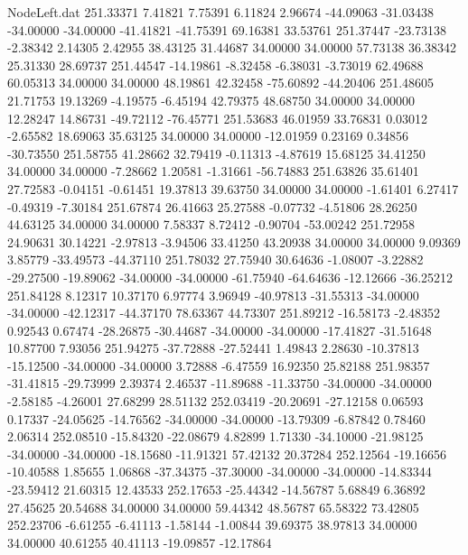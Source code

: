 \begin{filecontents}{NodeLeft.dat}
 251.33371    7.41821    7.75391     6.11824    2.96674  -44.09063  -31.03438  -34.00000  -34.00000  -41.41821  -41.75391   69.16381   33.53761
 251.37447  -23.73138   -2.38342     2.14305    2.42955   38.43125   31.44687   34.00000   34.00000   57.73138   36.38342   25.31330   28.69737
 251.44547  -14.19861   -8.32458    -6.38031   -3.73019   62.49688   60.05313   34.00000   34.00000   48.19861   42.32458  -75.60892  -44.20406
 251.48605   21.71753   19.13269    -4.19575   -6.45194   42.79375   48.68750   34.00000   34.00000   12.28247   14.86731  -49.72112  -76.45771
 251.53683   46.01959   33.76831     0.03012   -2.65582   18.69063   35.63125   34.00000   34.00000  -12.01959    0.23169    0.34856  -30.73550
 251.58755   41.28662   32.79419    -0.11313   -4.87619   15.68125   34.41250   34.00000   34.00000   -7.28662    1.20581   -1.31661  -56.74883
 251.63826   35.61401   27.72583    -0.04151   -0.61451   19.37813   39.63750   34.00000   34.00000   -1.61401    6.27417   -0.49319   -7.30184
 251.67874   26.41663   25.27588    -0.07732   -4.51806   28.26250   44.63125   34.00000   34.00000    7.58337    8.72412   -0.90704  -53.00242
 251.72958   24.90631   30.14221    -2.97813   -3.94506   33.41250   43.20938   34.00000   34.00000    9.09369    3.85779  -33.49573  -44.37110
 251.78032   27.75940   30.64636    -1.08007   -3.22882  -29.27500  -19.89062  -34.00000  -34.00000  -61.75940  -64.64636  -12.12666  -36.25212
 251.84128    8.12317   10.37170     6.97774    3.96949  -40.97813  -31.55313  -34.00000  -34.00000  -42.12317  -44.37170   78.63367   44.73307
 251.89212  -16.58173   -2.48352     0.92543    0.67474  -28.26875  -30.44687  -34.00000  -34.00000  -17.41827  -31.51648   10.87700    7.93056
 251.94275  -37.72888  -27.52441     1.49843    2.28630  -10.37813  -15.12500  -34.00000  -34.00000    3.72888   -6.47559   16.92350   25.82188
 251.98357  -31.41815  -29.73999     2.39374    2.46537  -11.89688  -11.33750  -34.00000  -34.00000   -2.58185   -4.26001   27.68299   28.51132
 252.03419  -20.20691  -27.12158     0.06593    0.17337  -24.05625  -14.76562  -34.00000  -34.00000  -13.79309   -6.87842    0.78460    2.06314
 252.08510  -15.84320  -22.08679     4.82899    1.71330  -34.10000  -21.98125  -34.00000  -34.00000  -18.15680  -11.91321   57.42132   20.37284
 252.12564  -19.16656  -10.40588     1.85655    1.06868  -37.34375  -37.30000  -34.00000  -34.00000  -14.83344  -23.59412   21.60315   12.43533
 252.17653  -25.44342  -14.56787     5.68849    6.36892   27.45625   20.54688   34.00000   34.00000   59.44342   48.56787   65.58322   73.42805
 252.23706   -6.61255   -6.41113    -1.58144   -1.00844   39.69375   38.97813   34.00000   34.00000   40.61255   40.41113  -19.09857  -12.17864

\end{filecontents}

